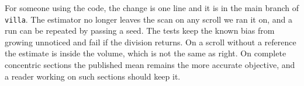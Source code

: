 For someone using the code, the change is one line and it is in the main branch of \texttt{villa}.
The estimator no longer leaves the scan on any scroll we ran it on, and a run can be repeated by
passing a seed. The tests keep the known bias from growing unnoticed and fail if the division
returns. On a scroll without a
reference the estimate is inside the volume, which is not the same as right. On complete
concentric sections the published mean remains the more accurate objective, and a reader working on
such sections should keep it.
